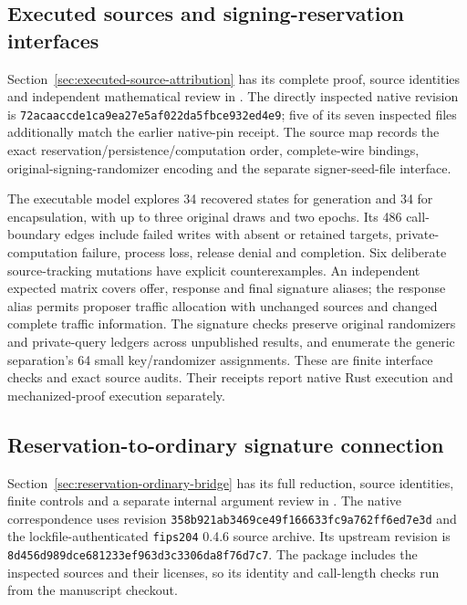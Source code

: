 \documentclass[pdflatex]{sn-jnl}
\theoremstyle{thmstyleone}
\theoremstyle{thmstylethree}
\theoremstyle{thmstyletwo}
\begin{document}
\subsection{Executed sources and signing-reservation interfaces}
\label{app:source-attribution}

Section~\ref{sec:executed-source-attribution} has its complete proof,
source identities and independent mathematical review in
. The directly inspected native
revision is \texttt{72acaaccde1ca9ea27e5af022da5fbce932ed4e9}; five of its
seven inspected files additionally match the earlier native-pin receipt.
The source map records the exact reservation/persistence/computation order,
complete-wire bindings, original-signing-randomizer encoding and the
separate signer-seed-file interface.

The executable model explores 34 recovered states for generation and
34 for encapsulation, with up to three original draws and two epochs.
Its 486 call-boundary edges include failed writes with absent or retained
targets, private-computation failure, process loss, release denial and
completion. Six deliberate source-tracking mutations have explicit
counterexamples. An independent expected matrix covers offer, response
and final signature aliases; the response alias permits proposer traffic
allocation with unchanged sources and changed complete traffic information.
The signature checks preserve original randomizers and private-query
ledgers across unpublished results, and enumerate the generic separation's
64 small key/randomizer assignments. These are finite interface checks
and exact source audits. Their receipts report native Rust execution and
mechanized-proof execution separately.

\subsection{Reservation-to-ordinary signature connection}
\label{app:signature-bridge}

Section~\ref{sec:reservation-ordinary-bridge} has its full reduction,
source identities, finite controls and a separate internal argument review
in . The native correspondence uses
revision \texttt{358b921ab3469ce49f166633fc9a762ff6ed7e3d} and the
lockfile-authenticated \texttt{fips204} 0.4.6 source archive. Its upstream
revision is \texttt{8d456d989dce681233ef963d3c3306da8f76d7c7}.
The package includes the inspected sources and their licenses, so
its identity and call-length checks run from the manuscript checkout.
\end{document}
